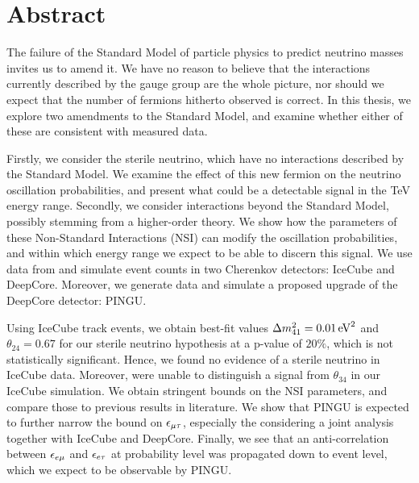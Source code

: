 \chapter*{Abstract}

The failure of the Standard Model of particle physics to predict neutrino masses invites us to amend it. We have no reason to believe that 
the interactions currently described by the gauge group are the whole picture, nor should we expect that the number of fermions hitherto observed is correct.
In this thesis, we explore two amendments to the Standard Model, and examine whether either of these are consistent with measured data.

Firstly, we consider the sterile neutrino, which have no interactions described by the Standard Model. We examine the effect of this 
new fermion on the neutrino oscillation probabilities, and present what could be a detectable signal in the \si{\TeV} energy range.
Secondly, we consider interactions beyond the Standard Model, possibly stemming from a higher-order theory.
We show how the parameters of these Non-Standard Interactions (NSI) can modify the oscillation probabilities, and within which energy range we expect to be able to discern this signal.
We use data from and simulate event counts in two Cherenkov detectors: IceCube and DeepCore. Moreover, we generate data and simulate a proposed upgrade of the DeepCore detector: PINGU. 

Using IceCube track events, we obtain best-fit values $\dm[41] = \SI{0.01}{\eV^2}$ and $\theta_{24} = 0.67$ for our sterile neutrino hypothesis at 
a p-value of $20\%$, which is not statistically significant. Hence, we found no evidence of a sterile neutrino in IceCube data. 
Moreover, were unable to distinguish a signal from $\theta_{34}$ in our IceCube simulation.
We obtain stringent bounds on the NSI parameters, and compare those to previous results in literature. We show that PINGU is expected to further narrow the bound 
on $\epsilon_{\mu\tau}$, especially the considering a joint analysis together with IceCube and DeepCore. Finally, we see that an anti-correlation between 
$\epsilon_{e\mu}$ and $\epsilon_{e\tau}$ at probability level was propagated down to event level, which we expect to be observable by PINGU.



